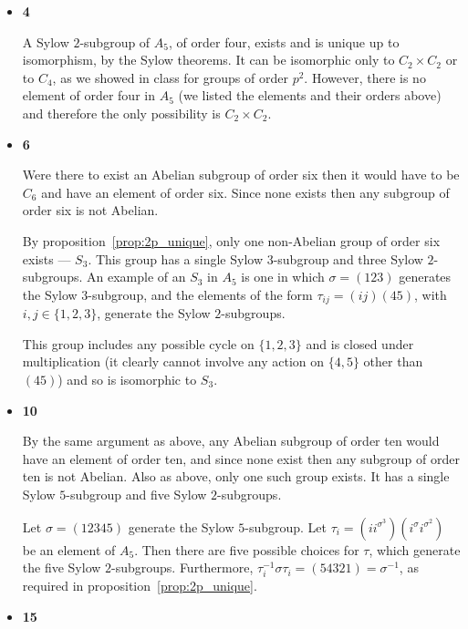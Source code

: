 \documentclass[11pt]{article} \usepackage{amssymb}
\begin{document}
\begin{enumerate}
\begin{itemize}
    \item {\bf 4}
      
      A Sylow $2$-subgroup of $A_5$, of order four,
      exists and is unique up to isomorphism, by the Sylow theorems. It can
      be isomorphic only to $C_2\times C_2$ or to $C_4$, as we showed in class
      for groups of order $p^2$. However, there is no element of order four
      in $A_5$ (we listed the elements and their orders above) and therefore
      the only possibility is $C_2 \times C_2$. 
      
    \item {\bf 6}

      Were there to exist an Abelian subgroup of order six then it would have
      to be $C_6$ and have an element of order six. Since none exists then
      any subgroup of order six is not Abelian.
      
      By proposition~\ref{prop:2p_unique}, only one non-Abelian group of order 
      six exists --- $S_3$. This group has
      a single Sylow $3$-subgroup and three Sylow $2$-subgroups. An example
      of an $S_3$ in $A_5$ is one in which $\sigma=(1 2 3)$ generates the Sylow
      $3$-subgroup, and the elements of the form $\tau_{ij}=(ij)(45)$, with 
      $i,j \in \{1,2,3\}$, generate the Sylow $2$-subgroups. 

      This group includes any possible cycle on $\{1,2,3\}$ and is closed under
      multiplication (it clearly cannot involve any action on $\{4,5\}$ other
      than $(45)$) and so is isomorphic to $S_3$.

    \item {\bf 10}

      By the same argument as above, any Abelian subgroup of order ten would
      have an element of order ten, and since none exist then  
      any subgroup of order ten is not Abelian. Also as above, only one such
      group exists. It has a single Sylow $5$-subgroup and five Sylow 
      $2$-subgroups.

      Let $\sigma=(12345)$ generate the Sylow 
      $5$-subgroup. Let 
      $\tau_i=\left(ii^{\sigma^3}\right)\left(i^{\sigma}i^{\sigma^2}\right)$ 
      be an element of $A_5$. Then there are five possible
      choices for $\tau$, which generate the five Sylow $2$-subgroups. Furthermore, 
      $\tau_i^{-1}\sigma\tau_i=(54321)=\sigma^{-1}$, as 
      required in proposition~\ref{prop:2p_unique}.

    \item {\bf 15}
      

\end{itemize}
\end{enumerate}
\end{document}
